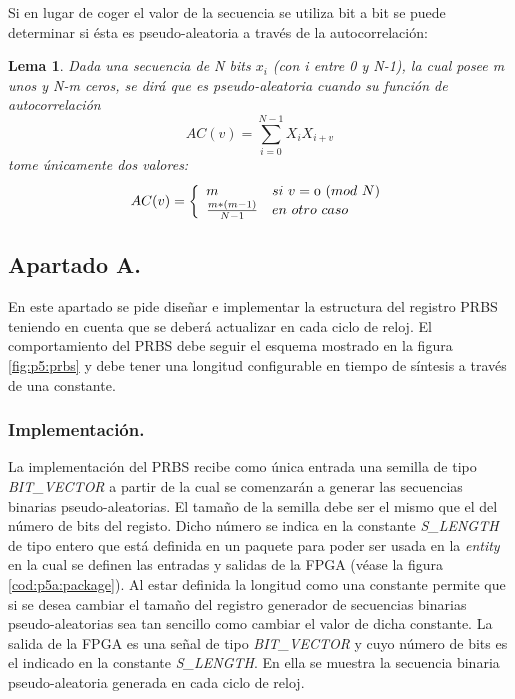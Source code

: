 \documentclass{article}
\begin{document}
Si en lugar de coger el valor de la secuencia se utiliza bit a bit se puede determinar si ésta es pseudo-aleatoria a través de la autocorrelación:

\newtheorem*{corolario}{Lema}
\begin{corolario}
	Dada una secuencia de N bits $x_i$ (con i entre 0 y N-1), la cual posee m unos y N-m ceros, se dirá que es pseudo-aleatoria cuando su función de autocorrelación
	\begin{equation}
		AC(v) = \sum_{i=0}^{N-1} X_i X_{i+v}
	\end{equation}
	tome únicamente dos valores:
	\begin{equation}
		AC(v) = 
		\left\{
			\begin{array}{ll}
				m & \mathnormal{si\ v = 0\ (mod\ N)} \\
				\frac{m*(m-1)}{N-1} & \mathnormal{en\ otro\ caso}
			\end{array}
		\right.
	\end{equation}	
\end{corolario}



\subsection{Apartado A.}

	En este apartado se pide diseñar e implementar la estructura del registro PRBS teniendo en cuenta que se deberá actualizar en cada ciclo de reloj. El comportamiento del PRBS debe seguir el esquema mostrado en la figura \ref{fig:p5:prbs} y debe tener una longitud configurable en tiempo de síntesis a través de una constante.
	
\subsubsection{Implementación.}

	La implementación del PRBS recibe como única entrada una semilla de tipo \emph{BIT\_VECTOR} a partir de la cual se comenzarán a generar las secuencias binarias pseudo-aleatorias. El tamaño de la semilla debe ser el mismo que el del número de bits del registo. Dicho número se indica en la constante \emph{S\_LENGTH} de tipo entero que está definida en un paquete para poder ser usada en la \emph{entity} en la cual se definen las entradas y salidas de la FPGA (véase la figura \ref{cod:p5a:package}). Al estar definida la longitud como una constante permite que si se desea cambiar el tamaño del registro generador de secuencias binarias pseudo-aleatorias sea tan sencillo como cambiar el valor de dicha constante. La salida de la FPGA es una señal de tipo \emph{BIT\_VECTOR} y cuyo número de bits es el indicado en la constante \emph{S\_LENGTH}. En ella se muestra la secuencia binaria pseudo-aleatoria generada en cada ciclo de reloj.
	
\end{document}
